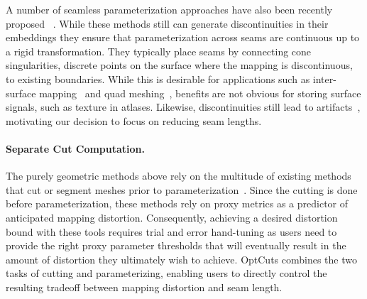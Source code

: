 A number of seamless parameterization approaches have also been recently proposed ~\cite{Kharevych,Myles}. While these methods still can generate discontinuities in their embeddings they ensure that parameterization across seams are continuous up to a rigid transformation. They typically place seams by connecting cone singularities, discrete points on the surface where the mapping is discontinuous, to existing boundaries. While this is desirable for applications such as inter-surface mapping~\cite{Aigerman} and quad meshing~\cite{Ray}, benefits are not obvious for storing surface signals, such as texture in atlases. Likewise, discontinuities still lead to artifacts~\cite{LiuFerguson}, motivating our decision to focus on reducing seam lengths. %


\paragraph{Separate Cut Computation.}
The purely geometric methods above rely on the multitude of existing methods that cut or segment meshes prior to parameterization~\cite{Sheffer2002Seamster,Julius2005D,Snyder2003Multi,Levy2002}.
Since the cutting is done before parameterization, these methods rely on proxy metrics as a predictor of anticipated mapping distortion. Consequently, achieving a desired distortion bound with these tools requires trial and error hand-tuning as users need to provide the right proxy parameter thresholds that will eventually result in the amount of distortion they ultimately wish to achieve. OptCuts combines the two tasks of cutting and parameterizing, enabling users to directly control the resulting tradeoff between mapping distortion and seam length. 

